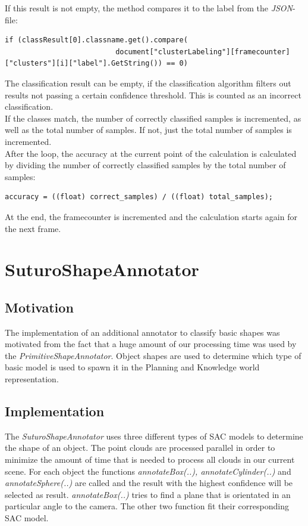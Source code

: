 \documentclass[main.tex]{subfiles}
\begin{document}
If this result is not empty, the method compares it to the label from the \textit{JSON}-file:

\begin{lstlisting}
if (classResult[0].classname.get().compare(
                          document["clusterLabeling"][framecounter]["clusters"][i]["label"].GetString()) == 0)
\end{lstlisting}

The classification result can be empty, if the classification algorithm filters out results not passing a certain confidence threshold. This is counted as an incorrect classification.\\

If the classes match, the number of correctly classified samples is incremented, as well as the total number of samples. If not, just the total number of samples is incremented.\\

After the loop, the accuracy at the current point of the calculation is calculated by dividing the number of correctly classified samples by the total number of samples:

\begin{lstlisting}
accuracy = ((float) correct_samples) / ((float) total_samples);
\end{lstlisting}

At the end, the framecounter is incremented and the calculation starts again for the next frame.

\section{SuturoShapeAnnotator}

\subsection{Motivation}
The implementation of an additional annotator to classify basic shapes was motivated from the fact that a huge amount of our processing time
was used by the \textit{PrimitiveShapeAnnotator}. Object shapes are used to determine which type of basic model is used to spawn it in the Planning and Knowledge world representation.

\subsection{Implementation}
The \textit{SuturoShapeAnnotator} uses three different types of SAC models to determine the shape of an object.
The point clouds are processed parallel in order to minimize the amount of time that is needed to process all clouds in our current scene.
For each object the functions \textit{annotateBox(..), annotateCylinder(..)} and \textit{annotateSphere(..)} are called and the result with the highest confidence
will be selected as result. \textit{annotateBox(..)} tries to find a plane that is orientated in an particular angle to the camera. 
The other two function fit their corresponding SAC model.
\end{document}
